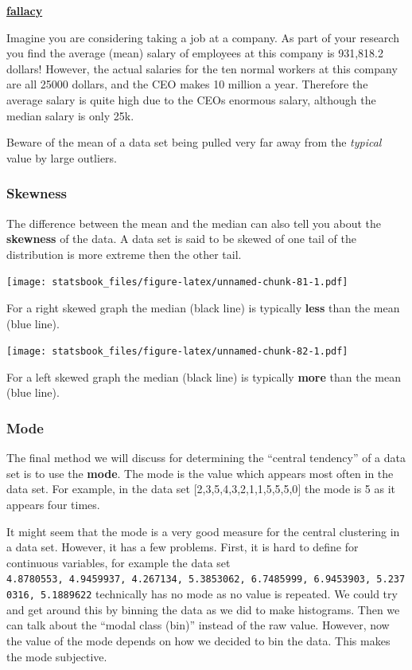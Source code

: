\documentclass[
]{book}
\newenvironment{rmdblock}[1]
  {\begin{shaded*}
  \centerline{\underline{\textbf{#1}}}

  }
  {
  \end{shaded*}
  }
\newenvironment{fallacy}
  {\begin{rmdblock}{fallacy}}
  {\end{rmdblock}}
\theoremstyle{definition}
\theoremstyle{definition}
\theoremstyle{definition}
\theoremstyle{definition}
\theoremstyle{remark}
\begin{document}
\begin{fallacy}
Imagine you are considering taking a job at a company. As part of your research you find the average (mean) salary of employees at this company is 931,818.2 dollars! However, the actual salaries for the ten normal workers at this company are all 25000 dollars, and the CEO makes 10 million a year. Therefore the average salary is quite high due to the CEOs enormous salary, although the median salary is only 25k.

Beware of the mean of a data set being pulled very far away from the \emph{typical} value by large outliers.
\end{fallacy}

\hypertarget{skewness}{%
\subsubsection{Skewness}\label{skewness}}

The difference between the mean and the median can also tell you about the \textbf{skewness} of the data. A data set is said to be skewed of one tail of the distribution is more extreme then the other tail.

\texttt{[image: statsbook\_files/figure-latex/unnamed-chunk-81-1.pdf]}

For a right skewed graph the median (black line) is typically \textbf{less} than the mean (blue line).

\texttt{[image: statsbook\_files/figure-latex/unnamed-chunk-82-1.pdf]}

For a left skewed graph the median (black line) is typically \textbf{more} than the mean (blue line).

\hypertarget{mode}{%
\subsubsection{Mode}\label{mode}}

The final method we will discuss for determining the ``central tendency'' of a data set is to use the \textbf{mode}. The mode is the value which appears most often in the data set. For example, in the data set {[}2,3,5,4,3,2,1,1,5,5,5,0{]} the mode is 5 as it appears four times.

It might seem that the mode is a very good measure for the central clustering in a data set. However, it has a few problems. First, it is hard to define for continuous variables, for example the data set \texttt{4.8780553,\ 4.9459937,\ 4.267134,\ 5.3853062,\ 6.7485999,\ 6.9453903,\ 5.2370316,\ 5.1889622} technically has no mode as no value is repeated. We could try and get around this by binning the data as we did to make histograms. Then we can talk about the ``modal class (bin)'' instead of the raw value. However, now the value of the mode depends on how we decided to bin the data. This makes the mode subjective.
\end{document}
